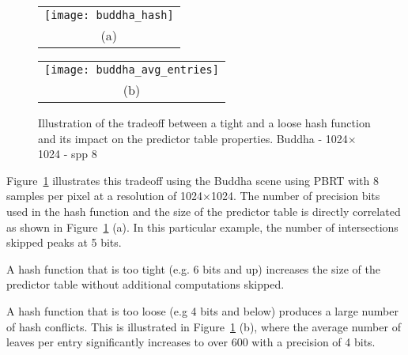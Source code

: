 \begin{figure}[htb]
  
  \centering
  \begin{tabular}[b]{c}
    \texttt{[image: buddha\_hash]} \\
    \small (a)
  \end{tabular} \qquad
  \begin{tabular}[b]{c}
    \texttt{[image: buddha\_avg\_entries]} \\
    \small (b)
  \end{tabular}

  \caption{\label{fig:buddha}
           Illustration of the tradeoff between a tight and a loose hash function and its impact on the predictor table properties. Buddha - 1024$\times$1024 - spp 8}
\end{figure}


Figure~\ref{fig:buddha} illustrates this tradeoff using the Buddha scene using PBRT with 8 samples per pixel at a resolution of 1024$\times$1024. The number of precision bits used in the hash function and the size of the predictor table is directly correlated as shown in Figure~\ref{fig:buddha} (a). In this particular example, the number of intersections skipped peaks at 5 bits.

A hash function that is too tight (e.g. 6 bits and up) increases the size of the predictor table without additional computations skipped. 

A hash function that is too loose (e.g 4 bits and below) produces a large number of hash conflicts. This is illustrated in Figure~\ref{fig:buddha} (b), where the average number of leaves per entry significantly increases to over 600 with a precision of 4 bits.